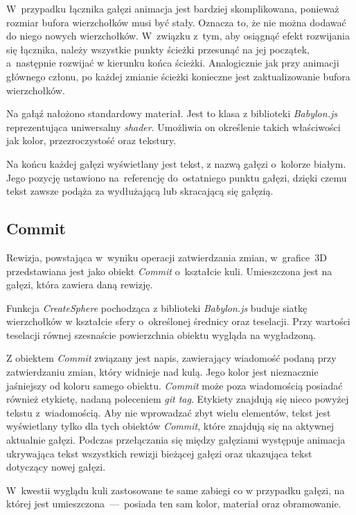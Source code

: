\documentclass[12pt,a4paper,polish,thesis]{dcsbook}
\begin{document}
{	W~przypadku łącznika gałęzi animacja jest bardziej skomplikowana, ponieważ rozmiar bufora wierzchołków musi być stały. Oznacza to, że nie można dodawać do niego nowych wierzchołków. W~związku z~tym, aby osiągnąć efekt rozwijania się łącznika, należy wszystkie punkty ścieżki przesunąć na jej początek, a~następnie rozwijać w kierunku końca ścieżki. Analogicznie jak przy animacji głównego członu, po każdej zmianie ścieżki konieczne jest zaktualizowanie bufora wierzchołków.

	Na gałąź nałożono standardowy materiał. Jest to klasa z biblioteki \textit{Babylon.js} reprezentująca uniwersalny \textit{shader}.  Umożliwia on określenie takich właściwości jak kolor, przezroczystość oraz tekstury.

	Na końcu każdej gałęzi wyświetlany jest tekst, z nazwą gałęzi o~kolorze białym. Jego pozycję ustawiono na~referencję do~ostatniego punktu gałęzi, dzięki czemu tekst zawsze podąża za wydłużającą lub skracającą się gałęzią.


	\subsection{Commit}
	Rewizja, powstająca w~wyniku operacji zatwierdzania zmian, w~grafice~3D przedstawiana jest jako obiekt \textit{Commit} o~kształcie kuli. Umieszczona jest na gałęzi, która zawiera daną rewizję.

	Funkcja \textit{CreateSphere} pochodząca z biblioteki \textit{Babylon.js} buduje siatkę wierzchołków w kształcie sfery o~określonej średnicy oraz teselacji. Przy wartości teselacji równej szesnaście powierzchnia obiektu wygląda na wygładzoną.

	Z obiektem \textit{Commit} związany jest napis, zawierający wiadomość podaną przy zatwierdzaniu zmian, który widnieje nad kulą.
	Jego kolor jest nieznacznie jaśniejszy od koloru samego obiektu. \textit{Commit} może poza wiadomością posiadać również etykietę, nadaną poleceniem \textit{git tag}. Etykiety znajdują się nieco powyżej tekstu z~wiadomością. Aby nie wprowadzać zbyt wielu elementów, tekst jest wyświetlany tylko dla tych obiektów \textit{Commit}, które znajdują się na aktywnej aktualnie gałęzi. Podczas przełączania się między gałęziami występuje animacja ukrywająca tekst wszystkich rewizji bieżącej gałęzi oraz ukazująca tekst dotyczący nowej gałęzi.

	 W~kwestii wyglądu kuli zastosowane te same zabiegi co w przypadku gałęzi, na której jest umieszczona~---~posiada ten sam kolor, materiał oraz obramowanie.

}
\end{document}
